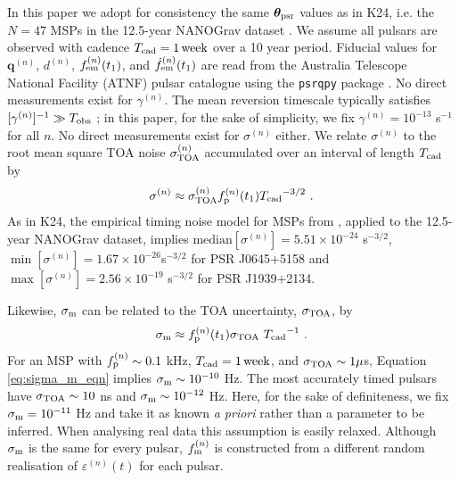 \documentclass[fleqn,usenatbib,useAMS]{mnras}
\begin{document}
In this paper we adopt for consistency the same $\boldsymbol{\theta}_{\rm psr}$ values as in K24, i.e. the $N=47$ MSPs in the 12.5-year NANOGrav dataset \citep{2020ApJ...905L..34A}. We assume all pulsars are observed with cadence $T_{\rm cad} = 1 \,{\rm week}$ over a 10 year period. Fiducial values for ${\boldsymbol{q}}^{(n)}$, $d^{(n)}$, $f_{\rm em}^{(n)}(t_1)$, and $\dot{f}^{(n)}_{\rm em}(t_1)$ are read from the Australia Telescope National Facility (ATNF) pulsar catalogue \citep{Manchester2005} using the \texttt{psrqpy} package \citep{psrqpy}. No direct measurements exist for $\gamma^{(n)}$. The mean reversion timescale typically satisfies $[\gamma^{(n)}]^{-1} \gg T_{\rm obs}$ \citep{Price2012,Myers2021MNRAS.502.3113M,Meyers2021,Vargas}; in this paper, for the sake of simplicity, we fix $\gamma^{(n)} = 10^{-13}$ s$^{-1}$ for all $n$. No direct measurements exist for $\sigma^{(n)}$ either. We relate $\sigma^{(n)}$ to the root mean square TOA noise $\sigma^{(n)}_{\rm TOA}$ accumulated over an interval of length $T_{\rm cad}$ by
\begin{eqnarray}
	\sigma^{(n)} \approx \sigma_{\rm TOA}^{(n)} f_{\rm p}^{(n)}(t_1) {T_{\rm cad}}^{-3/2} \ . \label{eq:sigmap_f}
\end{eqnarray}
As in K24, the empirical timing noise model for MSPs from \cite{Shannon2010ApJ...725.1607S}, applied to the 12.5-year NANOGrav dataset, implies $\text{median} [\sigma^{(n)}] = 5.51 \times 10^{-24} $ s$^{-3/2}$, $\min [ \sigma^{(n)} ] = 1.67 \times 10^{-26}$s$^{-3/2}$ for PSR J0645+5158 and $\max [ \sigma^{(n)} ] = 2.56 \times 10^{-19}$ s$^{-3/2}$ for PSR J1939+2134. \newline 
 
Likewise, $\sigma_{\rm m}$ can be related to the TOA uncertainty, $\sigma_{\rm TOA}$, by 
\begin{equation}
	\sigma_{\rm m} \approx f_{\rm p}^{(n)}(t_1) \sigma_{\rm TOA} \ {T_{\rm cad}}^{-1} \ . \label{eq:sigma_m_eqn}
\end{equation}
For an MSP with $f_{\rm p}^{(n)} \sim 0.1$ kHz, $T_{\rm cad} = 1 \, {\rm week}$, and $\sigma_{\rm TOA} \sim 1 \mu$s,  Equation \eqref{eq:sigma_m_eqn} implies $\sigma_{\rm m} \sim 10^{-10}$ Hz. The most accurately timed pulsars have $\sigma_{\rm TOA} \sim 10 $ ns and $\sigma_{\rm m} \sim 10^{-12}$ Hz. Here, for the sake of definiteness, we fix $\sigma_{\rm m} = 10^{-11}$ Hz and take it as known \textit{a priori} rather than a parameter to be inferred. When analysing real data this assumption is easily relaxed. Although $\sigma_{\rm m}$ is the same for every pulsar, $f_{\rm m} ^{(n)}$ is constructed from a different random realisation of $\varepsilon^{(n)}(t)$ for each pulsar. \newline  
\end{document}
